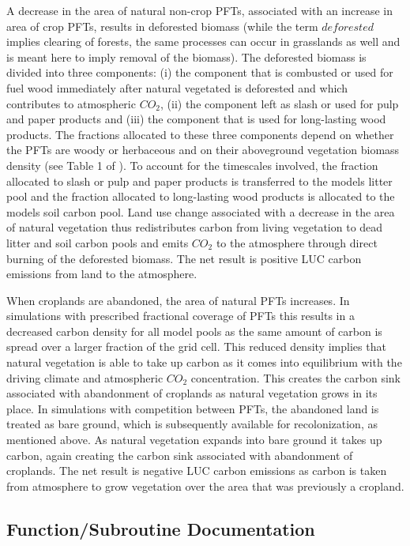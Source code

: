 A decrease in the area of natural non-\/crop P\+F\+Ts, associated with an increase in area of crop P\+F\+Ts, results in deforested biomass (while the term $\textit{deforested}$ implies clearing of forests, the same processes can occur in grasslands as well and is meant here to imply removal of the biomass). The deforested biomass is divided into three components\+: (i) the component that is combusted or used for fuel wood immediately after natural vegetated is deforested and which contributes to atmospheric $CO_2$, (ii) the component left as slash or used for pulp and paper products and (iii) the component that is used for long-\/lasting wood products. The fractions allocated to these three components depend on whether the P\+F\+Ts are woody or herbaceous and on their aboveground vegetation biomass density (see Table 1 of \cite{Arora2010-416}). To account for the timescales involved, the fraction allocated to slash or pulp and paper products is transferred to the model\textquotesingle{}s litter pool and the fraction allocated to long-\/lasting wood products is allocated to the model\textquotesingle{}s soil carbon pool. Land use change associated with a decrease in the area of natural vegetation thus redistributes carbon from living vegetation to dead litter and soil carbon pools and emits $CO_2$ to the atmosphere through direct burning of the deforested biomass. The net result is positive L\+U\+C carbon emissions from land to the atmosphere.

When croplands are abandoned, the area of natural P\+F\+Ts increases. In simulations with prescribed fractional coverage of P\+F\+Ts this results in a decreased carbon density for all model pools as the same amount of carbon is spread over a larger fraction of the grid cell. This reduced density implies that natural vegetation is able to take up carbon as it comes into equilibrium with the driving climate and atmospheric $CO_2$ concentration. This creates the carbon sink associated with abandonment of croplands as natural vegetation grows in its place. In simulations with competition between P\+F\+Ts, the abandoned land is treated as bare ground, which is subsequently available for recolonization, as mentioned above. As natural vegetation expands into bare ground it takes up carbon, again creating the carbon sink associated with abandonment of croplands. The net result is negative L\+U\+C carbon emissions as carbon is taken from atmosphere to grow vegetation over the area that was previously a cropland. 

\subsection{Function/\+Subroutine Documentation}
\hypertarget{group__landuse__change__luc_gaca416d24f2714c7a7de32fb9fb1033db}{}
